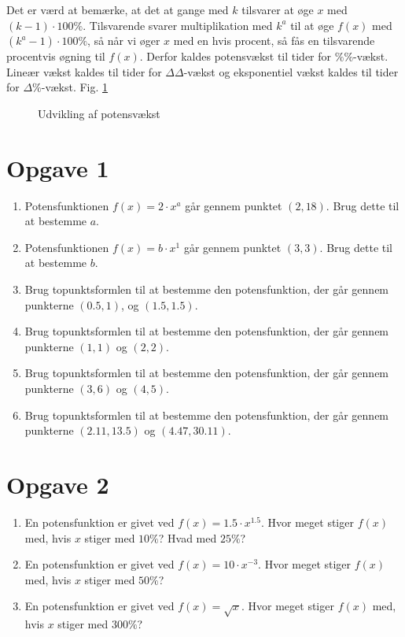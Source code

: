 \documentclass[12pt]{article}
\begin{document}
Det er værd at bemærke, at det at gange med $k$ tilsvarer at øge $x$ med $(k-1)\cdot 100 \%.$ Tilsvarende svarer multiplikation med $k^a$ til at øge $f(x)$ med $(k^a-1)\cdot 100\%$, så når vi øger $x$ med en hvis procent, så fås en tilsvarende procentvis øgning til $f(x)$. Derfor kaldes potensvækst til tider for $\%\%$-vækst. Lineær vækst kaldes til tider for $\Delta\Delta$-vækst og eksponentiel vækst kaldes til tider for $\Delta\%$-vækst. Fig. \ref{fig:potens}
\begin{figure}[H]
\centering
{}
\caption{Udvikling af potensvækst}
\label{fig:potens}
\end{figure}
\section*{Opgave 1}
\begin{enumerate}[label=\roman*)]
\item Potensfunktionen $f(x) = 2\cdot x^a$ går gennem punktet $(2,18)$. Brug dette til at bestemme $a$.
\item Potensfunktionen $f(x) = b\cdot x^1$ går gennem punktet $(3,3)$. Brug dette til at bestemme $b$.
\item Brug topunktsformlen til at bestemme den potensfunktion, der går gennem punkterne $(0.5,1)$, og $(1.5,1.5)$.
\item Brug topunktsformlen til at bestemme den potensfunktion, der går gennem punkterne $(1,1)$ og $(2,2)$.
\item Brug topunktsformlen til at bestemme den potensfunktion, der går gennem punkterne $(3,6)$ og $(4,5)$.
\item Brug topunktsformlen til at bestemme den potensfunktion, der går gennem punkterne $(2.11,13.5)$ og $(4.47,30.11)$.
\end{enumerate}
\section*{Opgave 2}
\begin{enumerate}
\item En potensfunktion er givet ved $f(x) = 1.5\cdot x^{1.5}$. Hvor meget stiger $f(x)$ med, hvis $x$ stiger med $10\%$? Hvad med $25\%$?
\item En potensfunktion er givet ved $f(x) = 10\cdot x^{-3}$. Hvor meget stiger $f(x)$ med, hvis $x$ stiger med $50\%$?
\item En potensfunktion er givet ved $f(x) = \sqrt{x}$. Hvor meget stiger $f(x)$ med, hvis $x$ stiger med $300\%$?
\end{enumerate}
\end{document}
